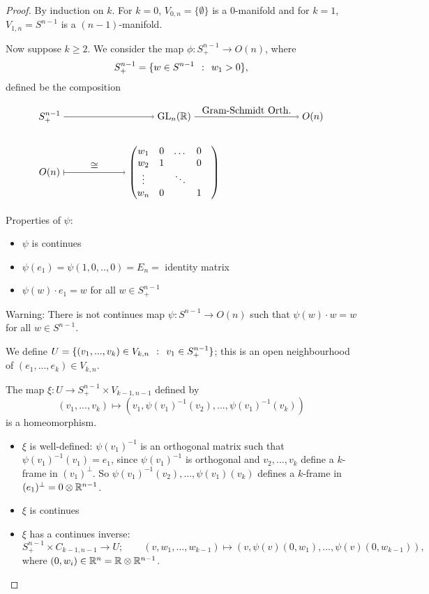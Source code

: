 \documentclass[a4paper,11pt,english]{article}
\begin{document}
\begin{proof}
By induction on $k$. For $k=0$, $V_{0,n} = \{ \emptyset \}$ is a 0-manifold and for
$k=1$, $V_{1,n} = S^{n-1}$ is a $(n-1)$-manifold.

Now suppose $k \ge 2$. We consider the map $\phi : S_+^{n-1} \to O(n)$, where
\[ S_+^{n-1} = \{ w \in S^{n-1} \:\::\:\: w_1 > 0 \}, \]
defined be the composition 

\[
\begin{tikzpicture}[node distance=2cm, auto]
  \node (tl) {$S_+^{n-1}$};
  \node (tm) [node distance=4.5cm, right of=tl] {$\GL_n(\R)$} ;
  \node (tr) [node distance=5cm, right of=tm] {$O(n)$};
  \node (bl) [below of=tl] {$O(n)$};
  \node (bm) [below of=tm] {$
        \pmat{ w_1 & 0 & \dots & 0 \\ 
              w_2 & 1 &  & 0 \\
           \vdots &   & \ddots &  &  \\
              w_n & 0 &  & 1
        }$};
  \node (br) [below of=tr] {};
  \draw[-to] (tl) to node {} (tm);
  \draw[-to] (tm) to node {Gram-Schmidt Orth.} (tr);
  \draw[|->] (bl) to node {$\cong$} (bm);
\end{tikzpicture}
\]

Properties of $\psi$:
\begin{itemize}
\item $\psi$ is continues 
\item $\psi(e_1) = \psi(1,0,..,0) = E_n = $ identity matrix
\item $\psi(w) \cdot e_1 = w$ for all $w \in S_+^{n-1}$
\end{itemize}

Warning: There is not continues map $\psi : S^{n-1} \to O(n)$ such that
$\psi(w) \cdot w = w$ for all $w\in S^{n-1}$.

We define $U = \{ (v_1 ,...,v_k) \in V_{k,n} \:\::\:\: v_1 \in S_+^{n-1} \}$; this is
an open neighbourhood of $(e_1,...,e_k) \in V_{k,n}$.

The map $\xi : U \to S_+^{n-1} \times V_{k-1,n-1}$ defined by
\[ (v_1, ..., v_k) \mapsto (v_1, \psi(v_1)^{-1}(v_2), ..., \psi (v_1)^{-1}
(v_k)) \]
is a homeomorphism. 

\begin{itemize}
\item $\xi$ is well-defined: 
$\psi(v_1)^{-1}$ is an orthogonal matrix such that $\psi(v_1)^{-1} (v_1) = e_1$,
since $\psi(v_1)^{-1}$ is orthogonal and $v_2,...,v_k$ define a $k$-frame in
$(v_1)^\perp$. So $\psi(v_1)^{-1}(v_2), ..., \psi(v_1)(v_k)$ defines a $k$-frame
in $(e_1)^\perp = 0 \otimes \mathbb{R}^{n-1}$.
\item $\xi$ is continues
\item $\xi$ has a continues inverse:
\[  S_+^{n-1} \times C_{k-1,n-1} \to U; \qquad (v, w_1, ..., w_{k-1}) \mapsto
(v, \psi(v)(0,w_1), ..., \psi(v)(0,w_{k-1})), \]
where $(0,w_i) \in \mathbb{R}^n = \mathbb{R} \otimes \mathbb{R}^{n-1}$.
\end{itemize}


\end{proof}
\end{document}
